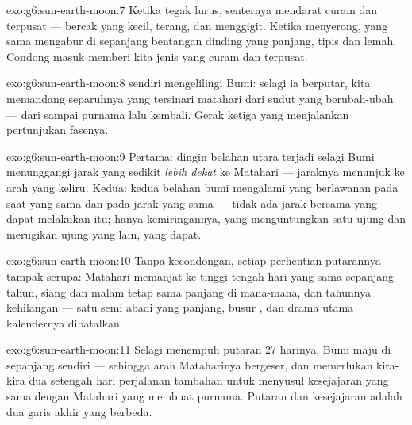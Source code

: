 \begin{solution}{exo:g6:sun-earth-moon:7}
Ketika tegak lurus,  senternya mendarat curam dan terpusat ---
bercak yang kecil, terang, dan menggigit. Ketika menyerong, 
yang sama mengabur di sepanjang bentangan dinding yang panjang, tipis
dan lemah. Condong masuk memberi kita jenis yang curam dan terpusat.
\end{solution}

\begin{solution}{exo:g6:sun-earth-moon:8}
  sendiri mengelilingi Bumi: selagi ia berputar, kita
memandang separuhnya yang tersinari matahari dari sudut yang
berubah-ubah --- dari  sampai purnama lalu kembali. Gerak ketiga
yang menjalankan pertunjukan fasenya.
\end{solution}

\begin{solution}{exo:g6:sun-earth-moon:9}
Pertama:  dingin belahan utara terjadi selagi Bumi menunggangi
jarak yang sedikit \emph{lebih dekat} ke Matahari --- jaraknya
menunjuk ke arah yang keliru. Kedua: kedua belahan bumi mengalami
 yang berlawanan pada saat yang sama dan pada jarak yang sama ---
tidak ada jarak bersama yang dapat melakukan itu; hanya kemiringannya,
yang menguntungkan satu ujung dan merugikan ujung yang lain, yang
dapat.
\end{solution}

\begin{solution}{exo:g6:sun-earth-moon:10}
Tanpa kecondongan, setiap perhentian putarannya tampak serupa:
Matahari memanjat ke tinggi tengah hari yang sama sepanjang tahun,
siang dan malam tetap sama panjang di mana-mana, dan tahunnya
kehilangan  --- satu  semi abadi yang panjang, busur  , dan drama utama kalendernya dibatalkan.
\end{solution}

\begin{solution}{exo:g6:sun-earth-moon:11}
Selagi  menempuh putaran $27$ harinya, Bumi maju di sepanjang
 sendiri --- sehingga arah Mataharinya bergeser, dan 
memerlukan kira-kira dua setengah hari perjalanan tambahan untuk
menyusul kesejajaran yang sama dengan Matahari yang membuat purnama.
Putaran dan kesejajaran adalah dua garis akhir yang berbeda.
\end{solution}

